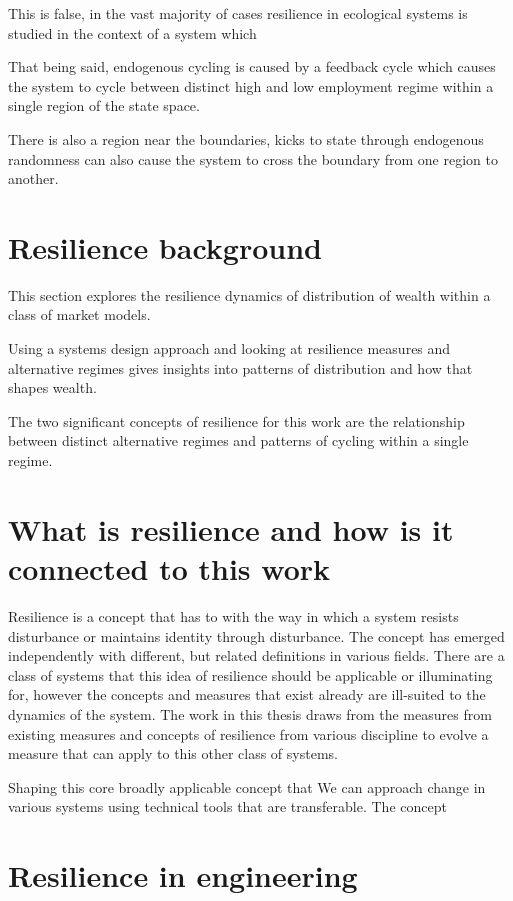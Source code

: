 This is false, in the vast majority of cases resilience in ecological systems is studied in the context of a system which 

That being said, endogenous cycling is caused by a feedback cycle which causes the system to cycle between distinct high and low employment regime within a single region of the state space.

There is also a region near the boundaries, kicks to state through endogenous randomness can also cause the system to cross the boundary from one region to another.


\section{Resilience background}

This section explores the resilience dynamics of distribution of wealth within a class of market models.  

Using a systems design approach and looking at resilience measures and alternative regimes gives insights into patterns of distribution and how that shapes wealth. 

The two significant concepts of resilience for this work are the relationship between distinct alternative regimes and patterns of cycling within a single regime. 

\section{What is resilience and how is it connected to this work}

Resilience is a concept that has to with the way in which a system resists disturbance or maintains identity through disturbance. The concept has emerged independently with different, but related definitions in various fields. 
There are a class of systems that this idea of resilience should be applicable or illuminating for, however the concepts and measures that exist already are ill-suited to the dynamics of the system. 
The work in this thesis draws from the measures from existing measures and concepts of resilience from various discipline to evolve a measure that can apply to this other class of systems. 

Shaping this core broadly applicable concept that 
We can approach change in various systems using technical tools that are transferable. 
The concept 

\section{Resilience in engineering}

